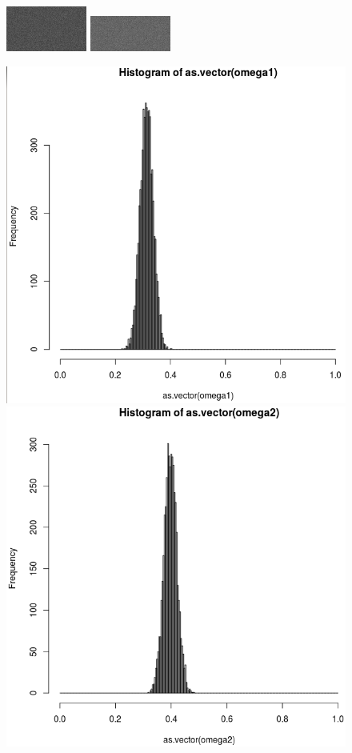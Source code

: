 \documentclass[a4paper,12pt]{report}
\begin{document}
\begin{figure}[!ht]
	\center
	\includegraphics[scale=1]{image/2classes_100_100_8bits_omega1.png}
	\hspace{6em}
	\includegraphics[scale=1]{image/2classes_100_100_8bits_omega2.png}
\end{figure}
\begin{figure}[!ht]
	\center
	\includegraphics[scale=0.3]{image/q21.png}
	\includegraphics[scale=0.3]{image/q22.png}
\end{figure}
\end{document}
